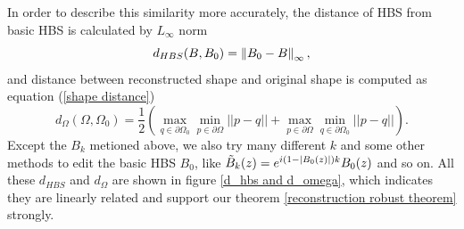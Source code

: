 \documentclass[review,onefignum,onetabnum]{siamonline190516}
\begin{document}
        In order to describe this similarity more accurately, the distance of HBS from basic HBS is calculated by $L_\infty$ norm
        $$d_{HBS}(B, B_0) = \left\Vert B_0 - B \right\Vert_\infty,$$
        and distance between reconstructed shape and original shape is computed as equation (\ref{shape distance})
        $$d_{\Omega}(\Omega, \Omega_0) =  \frac{1}{2}\left(\max_{q\in\partial \Omega_0} \min_{p\in\partial \Omega} ||p-q|| + \max_{p\in\partial \Omega} \min_{q\in\partial \Omega_0} ||p-q||\right).$$
        Except the $B_k$ metioned above, we also try many different $k$ and some other methods to edit the basic HBS $B_0$, like %
        $\tilde{B}_k(z) = e^{i(1-\left\vert B_0(z) \right\vert)k}B_0(z)$ and so on. All these $d_{HBS}$ and $d_\Omega$ are shown in figure \ref{d_hbs and d_omega}, which indicates they are linearly related and support our theorem \ref{reconstruction robust theorem} strongly.
\end{document}
